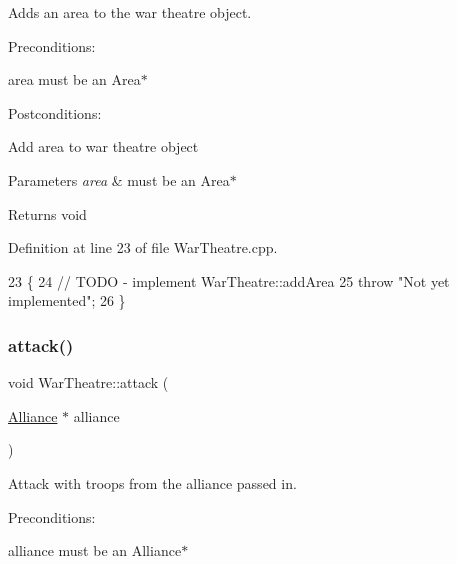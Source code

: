 Adds an area to the war theatre object. 

Preconditions\+:
\begin{DoxyItemize}
\item area must be an Area$\ast$
\end{DoxyItemize}

Postconditions\+:
\begin{DoxyItemize}
\item Add area to war theatre object
\end{DoxyItemize}


\begin{DoxyParams}{Parameters}
{\em area} & must be an Area$\ast$ \\
\hline
\end{DoxyParams}
\begin{DoxyReturn}{Returns}
void 
\end{DoxyReturn}


Definition at line 23 of file War\+Theatre.\+cpp.


\begin{DoxyCode}
23                                    \{
24     \textcolor{comment}{// TODO - implement WarTheatre::addArea}
25     \textcolor{keywordflow}{throw} \textcolor{stringliteral}{"Not yet implemented"};
26 \}
\end{DoxyCode}
\mbox{\label{classWarTheatre_a9c1a612347b0da87a0421e37f6b7b12b}} 
\subsubsection{\texorpdfstring{attack()}{attack()}}
{\footnotesize\ttfamily void War\+Theatre\+::attack (\begin{DoxyParamCaption}\item[{\hyperlink{classAlliance}{Alliance} $\ast$}]{alliance }\end{DoxyParamCaption})\hspace{0.3cm}{\ttfamily [virtual]}}



Attack with troops from the alliance passed in. 

Preconditions\+:
\begin{DoxyItemize}
\item alliance must be an Alliance$\ast$
\end{DoxyItemize}

